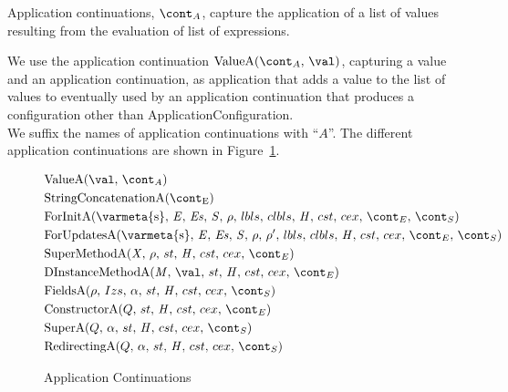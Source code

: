 \documentclass{article}
\begin{document}
Application continuations, $\acont$, capture the application of a list of values resulting from the evaluation of list of expressions.

\newcommand{\ValueA}[2]{\mathrm{ValueA}({#1},\,{#2})}
\newcommand{\StringConcatenationA}{\mathrm{StringConcatenationA(\econt)}}
\newcommand{\SuperMethodA}{\mathrm{SuperMethodA}(\idmeta,\,\env,\,\ExceptionHandlers,\,\econt)}
\newcommand{\StaticInvA}[4]{\mathrm{StaticInvocationA}({#1},\,{#2},\,{#3},\,\ExceptionHandlersRest,\,{#4})}
\newcommand{\DInstanceMethodA}{\mathrm{DInstanceMethodA}(\membermeta,\,\val,\,\ExceptionHandlers,\,\econt)}
\newcommand{\FieldsA}[4]{\mathrm{FieldsA}({#1},\,{#2},\,{#3},\,\strace,\,\handler,\,\cstrace,\,\cex,\,{#4})}
\newcommand{\SuperA}[3]{\mathrm{SuperA}({#1},\,{#2},\,\strace,\,\handler,\,\cstrace,\,\cex,\,{#3})}
\newcommand{\ConstructorA}[2]{\mathrm{ConstructorA}({#1},\,\strace,\,\handler,\,\cstrace,\,\cex,\,{#2})}
\newcommand{\RedirectingA}[3]{\mathrm{RedirectingA}({#1},\,{#2},\,\strace,\,\handler,\,\cstrace,\,\cex,\,{#3})}
\newcommand{\ForInitA}{\mathrm{ForInitA}(\mathrm{\varmeta{s}},\, \expressionmeta,\, \exprs,\, \statementmeta,\, \env,\, \lbls,\, \clbls,\, \handler,\, \cstrace,\, \cex,\, \econt,\, \scont)}
%
\newcommand{\ForUpdatesA}[1]{\mathrm{ForUpdatesA}(\mathrm{\varmeta{s}},\, \expressionmeta,\, \exprs,\, \statementmeta,\, \env,\, #1,\, \lbls,\, \clbls,\, \handler,\, \cstrace,\, \cex,\, \econt,\, \scont)}
\newcommand{\InstanceMethodA}{\mathrm{InstanceMethodA(\idmeta,\,\val,\,\strace,\,\handler,\,\cstrace,\,\cex,\,\econt)}}
\noindent
We use the application continuation $\ValueA{\acont}{\val}$, capturing a value and an application continuation, as application that adds a value to the list of values to eventually used by an application continuation that produces a configuration other than ApplicationConfiguration.\\
\noindent
We suffix the names of application continuations with ``$A$''.
The different application continuations are shown in Figure~\ref{figure:acont}.
\begin{figure}[Htp]
  \begin{align}
	&\ValueA{\val}{\acont} \label{acont:value}\\
	&\StringConcatenationA \label{acont:stringconcat}\\
	&\ForInitA \label{acont:forinit}\\
	&\ForUpdatesA{\env'} \label{acont:forupdates}\\
	&\SuperMethodA \label{acont:supermethod}\\
	&\DInstanceMethodA \label{acont:staticinv}\\
	&\FieldsA{\env}{Izs}{\loc}{\scont} \label{acont:fields}\\
	&\ConstructorA{Q}{\econt} \label{acont:constructor}\\
	&\SuperA{Q}{\loc}{\scont} \label{acont:super}\\
	&\RedirectingA{Q}{\loc}{\scont} \label{acont:redirecting}
  \end{align}
  \caption{Application Continuations}
  \label{figure:acont}
\end{figure}
\end{document}
